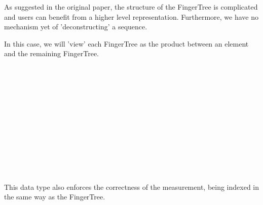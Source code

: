 \documentclass[12pt,twoside,notitlepage]{report}
\begin{document}
As suggested in the original paper, the structure of the FingerTree is complicated and users can benefit from a higher level representation. Furthermore, we have no mechanism yet of 'deconstructing' a sequence.

In this case, we will 'view' each FingerTree as the product between an element and the remaining FingerTree. 

\begin{code}
\\
\\
\>  \AgdaSymbol{\{}\AgdaSymbol{\}(} \AgdaSymbol{:}  \AgdaSymbol{)(} \AgdaSymbol{:}  \AgdaSymbol{)}\<%
\\
\>[8]\<[10]%
\>[10]  \AgdaSymbol{:}   \<%
\\
\>[8]\<[10]%
\>[10]  \AgdaSymbol{:}     \AgdaSymbol{:}\<%
\\
\>[8]\<[10]%
\>[10]\AgdaSymbol{\{} \AgdaSymbol{:} \AgdaSymbol{\}}    \<%
\\
\>[0]\<[2]%
\>[2] \AgdaSymbol{:} \<[10]%
\>[10]   \AgdaSymbol{\{}\AgdaSymbol{\}}\<%
\\
\>[0]\<[2]%
\>[2] \AgdaSymbol{:}  \AgdaSymbol{\{}\AgdaSymbol{\}}\<%
\\
\>[2]\<[10]%
\>[10]\AgdaSymbol{(} \AgdaSymbol{:} \AgdaSymbol{)}\<%
\\
\>[2]\<[10]%
\>[10] \AgdaSymbol{(} \AgdaSymbol{:}    \AgdaSymbol{\{}\AgdaSymbol{\})}\<%
\\
\>[2]\<[10]%
\>[10]    \AgdaSymbol{\{}    \AgdaSymbol{\}}\<%
\\
\end{code} 

This data type also enforces the correctness of the measurement, being indexed in the same way as the FingerTree. 
\end{document}
